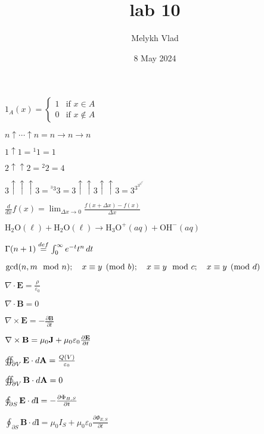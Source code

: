 \documentclass{article}
\title{lab 10}
\author{Melykh Vlad}
\date{8 May 2024}
\begin{document}
\maketitle


$1_A(x) = \begin{cases} 1 & \text{if } x \in A \\ 0 & \text{if } x \notin A \end{cases} \quad$

$n \uparrow \cdots \uparrow n = n \rightarrow n \rightarrow n$

$1 \uparrow 1 = {^{1}1} = 1$

$2 \uparrow \uparrow 2 = {^{2}2} = 4$

$3 \uparrow \uparrow \uparrow 3 = {^{^{3}3}3} = 3 \uparrow \uparrow 3 \uparrow \uparrow 3 = 3^{3^{3^{3^{3^{3^ {.^{.^{.^{3}}}}}}}}}$

$\frac{d}{dx} f(x) = \lim_{\Delta x \to 0} \frac{f(x + \Delta x) - f(x)}{\Delta x}$

$\text{H}_2\text{O}(\ell) + \text{H}_2\text{O}(\ell) \rightarrow \text{H}_3\text{O}^+(aq) + \text{OH}^-(aq)$

$\Gamma(n + 1) \overset{def}{=} \int_{0}^{\infty} e^{-t} t^n \, dt \\$

$\text{gcd}(n, m \mod n); \quad x \equiv y \pmod{b}; \quad x \equiv y \mod{c}; \quad x \equiv y \pmod{d} \\$

$\nabla \cdot \mathbf{E} = \frac{\rho}{\varepsilon_0} \quad$

$\nabla \cdot \mathbf{B} = 0 \quad$

$\nabla \times \mathbf{E} = -\frac{\partial \mathbf{B}}{\partial t} \quad$

$\nabla \times \mathbf{B} = \mu_0\mathbf{J} + \mu_0\varepsilon_0 \frac{\partial \mathbf{E}}{\partial t}
\\$

$\oiint_{\partial V} \mathbf{E} \cdot d\mathbf{A}  = \frac{Q(V)}{\varepsilon_0} \\$

$\oiint_{\partial V} \mathbf{B} \cdot d\mathbf{A}  = 0 \\$

$\oint_{\partial S} \mathbf{E} \cdot d\mathbf{l}   = -\frac{\partial \Phi_{B,S}}{\partial t} \\$

$\oint_{\partial S} \mathbf{B} \cdot d\mathbf{l} = \mu_0 I_S + \mu_0 \varepsilon_0 \frac{\partial\Phi_{E,S}}{\partial t}$
\end{document}
